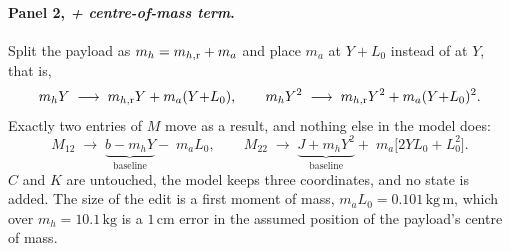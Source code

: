\paragraph{Panel 2, \textit{+ centre-of-mass term}.}
Split the payload as $m_h = m_{h,\mathrm{r}} + m_a$ and place $m_a$ at $Y + L_0$ instead of at $Y$, that is,
%
\begin{equation}
  m_h Y \;\longrightarrow\; m_{h,\mathrm{r}} Y + m_a (Y{+}L_0),
  \qquad
  m_h Y^2 \;\longrightarrow\; m_{h,\mathrm{r}} Y^2 + m_a (Y{+}L_0)^2 .
  \label{eq:panel-substitution}
\end{equation}
%
Exactly two entries of $M$ move as a result, and nothing else in the model does:
%
\begin{equation}
  M_{12} \;\longrightarrow\; \underbrace{b - m_h Y}_{\text{baseline}} - \; m_a L_0 ,
  \qquad
  M_{22} \;\longrightarrow\; \underbrace{J + m_h Y^2}_{\text{baseline}}
          + \; m_a\bigl[2 Y L_0 + L_0^2\bigr] .
  \label{eq:panel-fix1}
\end{equation}
%
$C$ and $K$ are untouched, the model keeps three coordinates, and no state is added. The size of
the edit is a first moment of mass, $m_a L_0 = 0.101\,\mathrm{kg\,m}$, which over
$m_h = 10.1\,\mathrm{kg}$ is a $1\,\mathrm{cm}$ error in the assumed position of the payload's
centre of mass.

